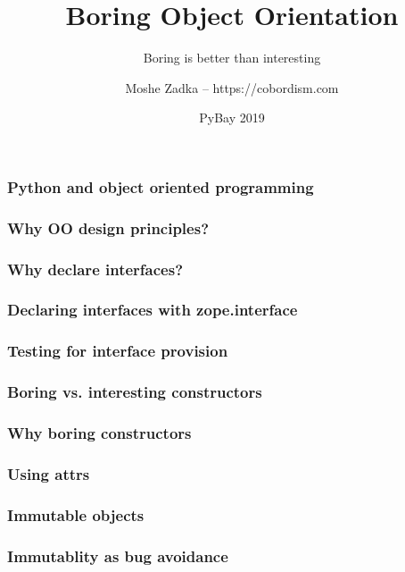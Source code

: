 \usepackage{listings}
\usepackage{textcomp}
\usepackage{fancyvrb}

\title{Boring Object Orientation}
\subtitle{Boring is better than interesting}
\author{Moshe Zadka -- https://cobordism.com}
\date{PyBay 2019}


\begin{titlepage}
\maketitle
\end{titlepage}

\frame{\titlepage}

\begin{frame}[fragile]
\frametitle{Python and object oriented programming}
\end{frame}

\begin{frame}[fragile]
\frametitle{Why OO design principles?}
\end{frame}

\begin{frame}[fragile]
\frametitle{Why declare interfaces?}
\end{frame}

\begin{frame}[fragile]
\frametitle{Declaring interfaces with zope.interface}
\end{frame}

\begin{frame}[fragile]
\frametitle{Testing for interface provision}
\end{frame}

\begin{frame}[fragile]
\frametitle{Boring vs. interesting constructors}
\end{frame}

\begin{frame}[fragile]
\frametitle{Why boring constructors}
\end{frame}

\begin{frame}[fragile]
\frametitle{Using attrs}
\end{frame}

\begin{frame}[fragile]
\frametitle{Immutable objects}
\end{frame}

\begin{frame}[fragile]
\frametitle{Immutablity as bug avoidance}
\end{frame}


